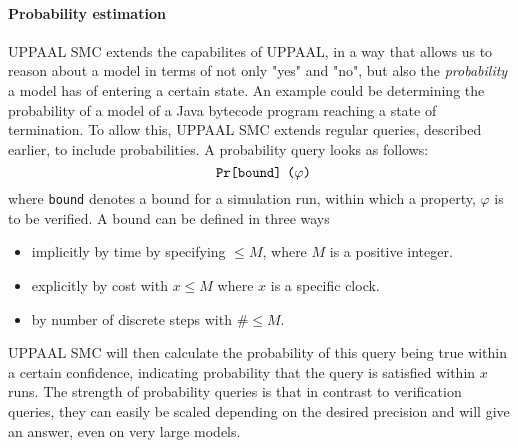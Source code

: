 \paragraph{Probability estimation}
UPPAAL SMC extends the capabilites of UPPAAL, in a way that allows us to reason about a model in terms of not only "yes" and "no", but also the \textit{probability} a model has of entering a certain state. An example could be determining the probability of a model of a Java bytecode program reaching a state of termination. To allow this, UPPAAL SMC extends regular queries, described earlier, to include probabilities. A probability query looks as follows:
$$\texttt{Pr\relax[bound\relax] ($\varphi$)}$$
where \texttt{bound} denotes a bound for a simulation run, within which a property, $\varphi$ is to be verified. A bound can be defined in three ways~\cite[p. 402]{smc}

\begin{itemize}
\item implicitly by time by specifying $\leq M$, where $M$ is a positive integer.
\item explicitly by cost with $x \leq M$ where $x$ is a specific clock.
\item by number of discrete steps with $\# \leq M$.\\
\end{itemize}
\noindent UPPAAL SMC will then calculate the probability of this query being true within a certain confidence, indicating probability that the query is satisfied within $x$ runs. The strength of probability queries is that in contrast to verification queries, they can easily be scaled depending on the desired precision and will give an answer, even on very large models.